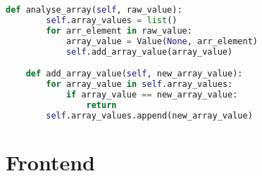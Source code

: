 \begin{lstlisting}[language=python, caption={Value.analyse\_array},label={lst:backend_value_analyse_array}]
    def analyse_array(self, raw_value):
        self.array_values = list()
        for arr_element in raw_value:
            array_value = Value(None, arr_element)
            self.add_array_value(array_value)

    def add_array_value(self, new_array_value):
        for array_value in self.array_values:
            if array_value == new_array_value:
                return
        self.array_values.append(new_array_value)
\end{lstlisting}


\section{Frontend}
\label{sec:frontend}

\subsection{}
\label{sub:rest_api}


